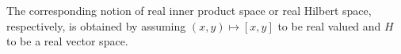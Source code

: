 The corresponding notion of real inner product space or real Hilbert space, respectively, is obtained by assuming $(x, y) \mapsto [x, y]$ to be real valued and $H$ to be a real vector space.
